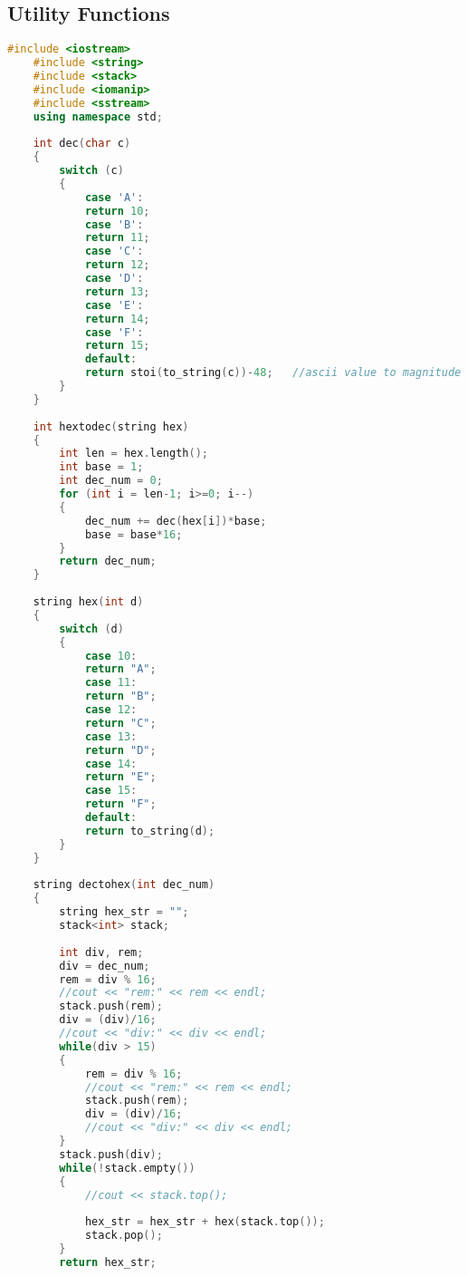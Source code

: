 \documentclass[12pt]{article}
\begin{document}
\subsection{Utility Functions}
\begin{lstlisting}[language=C++, caption={Helper Functions}]
    #include <iostream>
    #include <string>
    #include <stack>
    #include <iomanip>
    #include <sstream>
    using namespace std;
    
    int dec(char c)
    {
        switch (c)
        {
            case 'A':
            return 10;
            case 'B':
            return 11;
            case 'C':
            return 12;
            case 'D':
            return 13;
            case 'E':
            return 14;
            case 'F':
            return 15;
            default:
            return stoi(to_string(c))-48;   //ascii value to magnitude
        }
    }
    
    int hextodec(string hex)
    {
        int len = hex.length();
        int base = 1;
        int dec_num = 0;
        for (int i = len-1; i>=0; i--)
        {
            dec_num += dec(hex[i])*base;
            base = base*16;
        }
        return dec_num;
    }
    
    string hex(int d)
    {
        switch (d)
        {
            case 10:
            return "A";
            case 11:
            return "B";
            case 12:
            return "C";
            case 13:
            return "D";
            case 14:
            return "E";
            case 15:
            return "F";
            default:
            return to_string(d);
        }
    }
    
    string dectohex(int dec_num)
    {
        string hex_str = "";
        stack<int> stack;
    
        int div, rem;
        div = dec_num;
        rem = div % 16;
        //cout << "rem:" << rem << endl;
        stack.push(rem);
        div = (div)/16;
        //cout << "div:" << div << endl;
        while(div > 15)
        {
            rem = div % 16;
            //cout << "rem:" << rem << endl;
            stack.push(rem);
            div = (div)/16;
            //cout << "div:" << div << endl;
        }
        stack.push(div);
        while(!stack.empty())
        {
            //cout << stack.top();
            
            hex_str = hex_str + hex(stack.top());
            stack.pop();
        }
        return hex_str;
    

\end{lstlisting}
\end{document}
